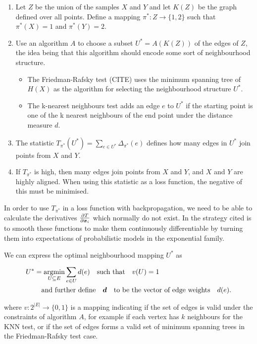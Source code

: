\begin{enumerate}
    \item Let $Z$ be the union of the samples $X$ and $Y$ and let $K(Z)$ be the graph defined over all points. Define a mapping $\pi^* : Z \rightarrow \{1, 2\}$ such that $\pi^*(X) = 1$ and $\pi^*(Y) = 2$.
    \item Use an algorithm $A$ to choose a subset $U^* = A(K(Z))$ of the edges of $Z$, the idea being that this algorithm should encode some sort of neighbourhood structure.
    \begin{itemize}
        \item The Friedman-Rafsky test (CITE) uses the minimum spanning tree of $H(X)$ as the algorithm for selecting the neighbourhood structure $U^*$. 

        \item The k-nearest neighbours test adds an edge $e$ to $U^*$ if the starting point is one of the k nearest neighbours of the end point under the distance measure $d$.
    \end{itemize}
    \item The statistic $T_{\pi^*}(U^*) = \sum_{e \in U^*} \Delta_{\pi^*} (e)$ defines how many edges in $U^*$ join points from $X$ and $Y$. 
    \item If $T_{\pi^*}$ is high, then many edges join points from $X$ and $Y$, and $X$ and $Y$ are highly aligned. When using this statistic as a loss function, the negative of this must be minimised.
\end{enumerate}

In order to use $T_{\pi^*}$ in a loss function with backpropagation, we need to be able to calculate the derivatives $\frac{\partial T}{\partial \boldsymbol{x}_i}$ which normally do not exist. In \cite{torchtwosample} the strategy cited is to smooth these functions to make them continuously differentiable by turning them into expectations of probabilistic models in the exponential family. 

We can express the optimal neighbourhood mapping $U^*$ as 

\begin{equation}
\begin{split}
U^* &= \underset{U \subseteq E}{\operatorname{argmin}} \sum_{e \in U} d(e) \quad \text{such that} \quad v(U) = 1 \\
&\quad \text{and further define} \quad \boldsymbol{d} \quad \text{to be the vector of edge weights} \quad d(e). 
\end{split}
\end{equation}

where $v: 2^{|E|} \rightarrow \{0, 1 \}$ is a mapping indicating if the set of edges is valid under the constraints of algorithm $A$, for example if each vertex has $k$ neighbours for the KNN test, or if the set of edges forms a valid set of minimum spanning trees in the Friedman-Rafsky test case. 

